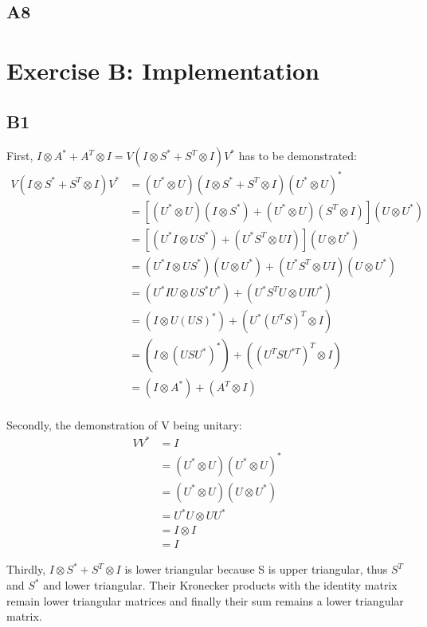 \documentclass[11pt]{article}
\begin{document}
\subsection*{A8}

\section*{Exercise B: Implementation}
\subsection*{B1}
First, $I \otimes A^{*} + A^{T} \otimes I = V (I \otimes S^{*} + S^{T} \otimes I) V^{*}$ has to be demonstrated:\\

\begin{align*}
   V (I \otimes S^{*} + S^{T} \otimes I) V^{*} &= (U^{*} \otimes U) (I \otimes S^{*} + S^{T} \otimes I) (U^{*} \otimes U)^{*} \\
   &= [(U^{*} \otimes U) (I \otimes S^{*}) + (U^{*} \otimes U) (S^{T} \otimes I)] (U \otimes U^{*}) \\
   &= [(U^{*} I \otimes U S^{*}) + (U^{*}S^{T} \otimes U I)] (U \otimes U^{*}) \\
   &= (U^{*} I \otimes U S^{*}) (U \otimes U^{*}) + (U^{*}S^{T} \otimes U I) (U \otimes U^{*}) \\
   &= (U^{*} I U \otimes U S^{*} U^{*}) + (U^{*}S^{T}U \otimes U I U^{*}) \\
   &= (I \otimes U (U S)^{*} ) + (U^{*} (U^{T} S)^{T} \otimes I) \\
   &= (I \otimes (U S U^{*})^{*} ) + ((U^{T} S U^{*T})^{T} \otimes I) \\
   &= (I \otimes A^{*} ) + (A^{T} \otimes I) \\
\end{align*}

Secondly, the demonstration of V being unitary:\\

\begin{align*}
   V V^{*} &= I \\
   &= (U^{*} \otimes U) (U^{*} \otimes U)^{*} \\
   &= (U^{*} \otimes U) (U \otimes U^{*}) \\
   &= U^{*} U \otimes U U^{*} \\
   &= I \otimes I \\
   &= I
\end{align*}

Thirdly, $I \otimes S^{*} + S^{T} \otimes I$ is lower triangular because S is upper triangular, thus $S^{T}$ and $S^{*}$ and lower triangular. Their Kronecker products with the identity matrix remain lower triangular matrices and finally their sum remains a lower triangular matrix. \\
\end{document}
